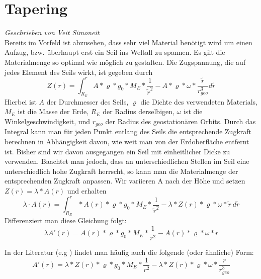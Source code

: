 \documentclass[a4paper, 10pt]{report}
\begin{document}
\section{Tapering} 
\textsl{Geschrieben von Veit Simoneit}\\
Bereits im Vorfeld ist abzusehen, dass sehr viel Material benötigt wird um einen Aufzug, bzw. überhaupt erst ein Seil ins Weltall zu spannen. Es gilt die Materialmenge so optimal wie möglich zu gestalten. 
Die Zugspannung, die auf jedes Element des Seils wirkt, ist gegeben durch
\begin{equation}
Z(r) = \int_{R_E}^{r} A*\varrho*g_0*M_E*\frac{1}{\tilde{r}^2} - A*\varrho*\omega*\frac{ \tilde{r}}{r_{geo}^3} d\tilde{r}
\end{equation}
Hierbei ist $A$ der Durchmesser des Seils, $\varrho$ die Dichte des verwendeten Materials, $M_E$ ist die Masse der Erde, $R_E$ der Radius derselbigen, $\omega$ ist die Winkelgeschwindigkeit, und $r_{geo}$ der Radius des geostationären Orbits. Durch das Integral kann man für jeden Punkt entlang des Seils die entsprechende Zugkraft berechnen in Abhängigkeit davon, wie weit man von der Erdoberfläche entfernt ist.
Bisher sind wir davon ausgegangen ein Seil mit einheitlicher Dicke zu verwenden. Baachtet man jedoch, dass an unterschiedlichen Stellen im Seil eine unterschiedlich hohe Zugkraft herrscht, so kann man die Materialmenge der entsprechenden Zugkraft anpassen.
Wir variieren A nach der Höhe und setzen $Z(r)=\lambda*A(r)$ und erhalten
\begin{equation}
\lambda \cdot A(r) = \int_{R_E}^{r}*A(r)*\varrho*g_0*M_E*\frac{1}{\tilde{r}^2} - \lambda*Z(r)*\varrho*\omega*\tilde{r}\ d\tilde{r}
\end{equation}
Differenziert man diese Gleichung folgt:
\begin{equation}
\lambda A'(r)= A(r)*\varrho*g_0*M_E*\frac{1}{r^2} - A(r)*\varrho*\omega*r
\end{equation}

In der Literatur (e.g \cite{aravind2007physics}) findet man häufig auch die folgende (oder ähnliche) Form:
\begin{equation}
A'(r)= \lambda*Z(r)*\varrho*g_0*M_E*\frac{1}{r^2} - \lambda*Z(r)*\varrho*\omega*\frac{r}{r_{geo}^3}
\end{equation}
\end{document}
